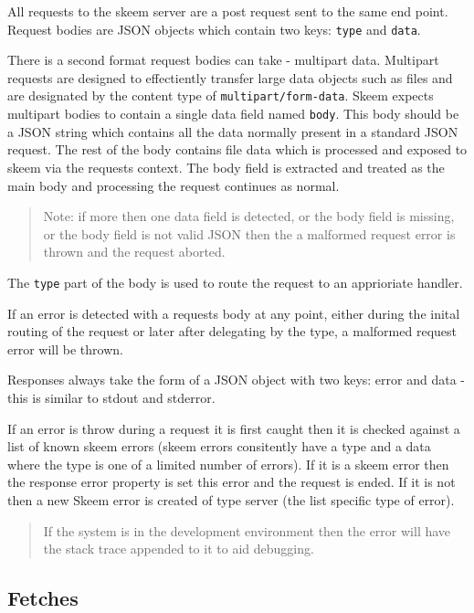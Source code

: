 \documentclass[
  12pt,
]{article}
\newcommand{\passthrough}[1]{#1}
\begin{document}
All requests to the skeem server are a post request sent to the same end
point. Request bodies are JSON objects which contain two keys:
\passthrough{\lstinline!type!} and \passthrough{\lstinline!data!}.

There is a second format request bodies can take - multipart data.
Multipart requests are designed to effectiently transfer large data
objects such as files and are designated by the content type of
\passthrough{\lstinline!multipart/form-data!}. Skeem expects multipart
bodies to contain a single data field named
\passthrough{\lstinline!body!}. This body should be a JSON string which
contains all the data normally present in a standard JSON request. The
rest of the body contains file data which is processed and exposed to
skeem via the requests context. The body field is extracted and treated
as the main body and processing the request continues as normal.

\begin{quote}
Note: if more then one data field is detected, or the body field is
missing, or the body field is not valid JSON then the a malformed
request error is thrown and the request aborted.
\end{quote}

The \passthrough{\lstinline!type!} part of the body is used to route the
request to an apprioriate handler.

If an error is detected with a requests body at any point, either during
the inital routing of the request or later after delegating by the type,
a malformed request error will be thrown.

Responses always take the form of a JSON object with two keys: error and
data - this is similar to stdout and stderror.

If an error is throw during a request it is first caught then it is
checked against a list of known skeem errors (skeem errors consitently
have a type and a data where the type is one of a limited number of
errors). If it is a skeem error then the response error property is set
this error and the request is ended. If it is not then a new Skeem error
is created of type server (the list specific type of error).

\begin{quote}
If the system is in the development environment then the error will have
the stack trace appended to it to aid debugging.
\end{quote}

\hypertarget{fetches}{%
\subsection{Fetches}\label{fetches}}
\end{document}
